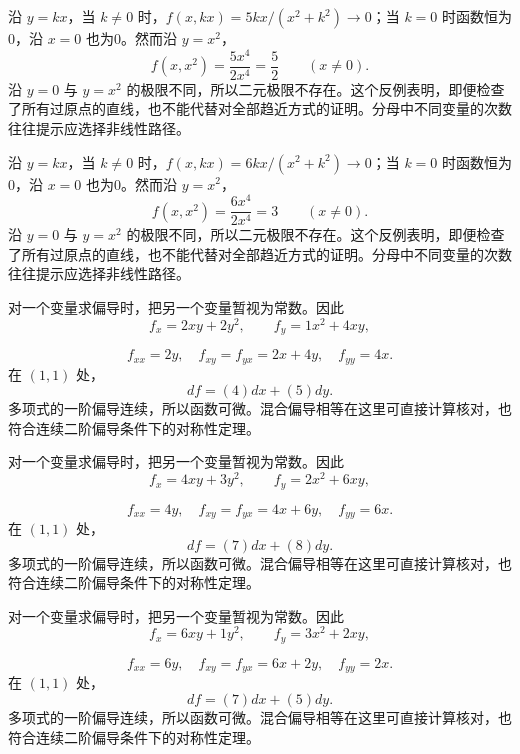 \documentclass[UTF8,12pt,a4paper,fontset=fandol]{ctexart}
\begin{document}
\begin{solve}\label{ans:c32q12}
沿 $y=kx$，当 $k\ne0$ 时，$f(x,kx)=5kx/(x^2+k^2)\to0$；当 $k=0$ 时函数恒为0，沿 $x=0$ 也为0。然而沿 $y=x^2$，
\[
f(x,x^2)=\frac{5x^4}{2x^4}=\frac{5}{2}\qquad(x\ne0).
\]
沿 $y=0$ 与 $y=x^2$ 的极限不同，所以二元极限不存在。这个反例表明，即便检查了所有过原点的直线，也不能代替对全部趋近方式的证明。分母中不同变量的次数往往提示应选择非线性路径。
\end{solve}

\begin{solve}\label{ans:c32q13}
沿 $y=kx$，当 $k\ne0$ 时，$f(x,kx)=6kx/(x^2+k^2)\to0$；当 $k=0$ 时函数恒为0，沿 $x=0$ 也为0。然而沿 $y=x^2$，
\[
f(x,x^2)=\frac{6x^4}{2x^4}=3\qquad(x\ne0).
\]
沿 $y=0$ 与 $y=x^2$ 的极限不同，所以二元极限不存在。这个反例表明，即便检查了所有过原点的直线，也不能代替对全部趋近方式的证明。分母中不同变量的次数往往提示应选择非线性路径。
\end{solve}

\begin{solve}\label{ans:c32q14}
对一个变量求偏导时，把另一个变量暂视为常数。因此
\[
f_x=2xy+2y^2,\qquad f_y=1x^2+4xy,
\]

\[
f_{xx}=2y,\quad f_{xy}=f_{yx}=2x+4y,\quad f_{yy}=4x.
\]
在 $(1,1)$ 处，
\[
df=(4)dx+(5)dy.
\]
多项式的一阶偏导连续，所以函数可微。混合偏导相等在这里可直接计算核对，也符合连续二阶偏导条件下的对称性定理。
\end{solve}

\begin{solve}\label{ans:c32q15}
对一个变量求偏导时，把另一个变量暂视为常数。因此
\[
f_x=4xy+3y^2,\qquad f_y=2x^2+6xy,
\]

\[
f_{xx}=4y,\quad f_{xy}=f_{yx}=4x+6y,\quad f_{yy}=6x.
\]
在 $(1,1)$ 处，
\[
df=(7)dx+(8)dy.
\]
多项式的一阶偏导连续，所以函数可微。混合偏导相等在这里可直接计算核对，也符合连续二阶偏导条件下的对称性定理。
\end{solve}

\begin{solve}\label{ans:c32q16}
对一个变量求偏导时，把另一个变量暂视为常数。因此
\[
f_x=6xy+1y^2,\qquad f_y=3x^2+2xy,
\]

\[
f_{xx}=6y,\quad f_{xy}=f_{yx}=6x+2y,\quad f_{yy}=2x.
\]
在 $(1,1)$ 处，
\[
df=(7)dx+(5)dy.
\]
多项式的一阶偏导连续，所以函数可微。混合偏导相等在这里可直接计算核对，也符合连续二阶偏导条件下的对称性定理。
\end{solve}
\end{document}
